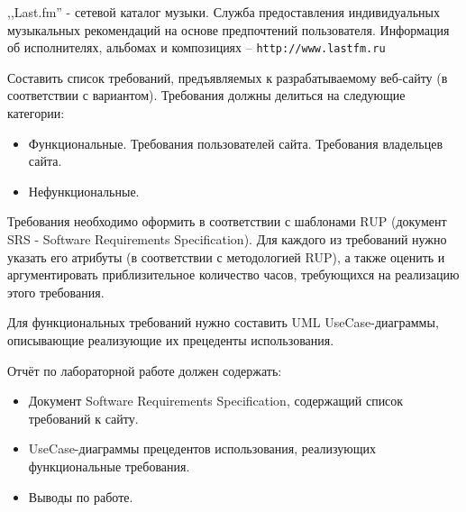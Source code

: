 \newpage

,,Last.fm'' - сетевой каталог музыки.
Служба предоставления индивидуальных музыкальных рекомендаций на основе предпочтений пользователя.
Информация об исполнителях, альбомах и композициях -- \texttt{http://www.lastfm.ru}

Составить список требований, предъявляемых к разрабатываемому веб-сайту (в соответствии с вариантом).
Требования должны делиться на следующие категории:
\begin{itemize}
    \item Функциональные.
    \subitem Требования пользователей сайта.
    \subitem Требования владельцев сайта.
    \item Нефункциональные.
\end{itemize}

Требования необходимо оформить в соответствии с шаблонами RUP (документ SRS - Software Requirements Specification).
Для каждого из требований нужно указать его атрибуты (в соответствии с методологией RUP),
а также оценить и аргументировать приблизительное количество часов, требующихся на реализацию этого требования.

Для функциональных требований нужно составить UML UseCase-диаграммы, описывающие реализующие их прецеденты использования.

Отчёт по лабораторной работе должен содержать:
\begin{itemize}
    \item Документ Software Requirements Specification, содержащий список требований к сайту.
    \item UseCase-диаграммы прецедентов использования, реализующих функциональные требования.
    \item Выводы по работе.
\end{itemize}
